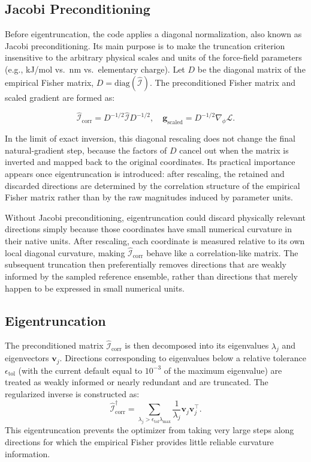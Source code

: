 \subsection{Jacobi Preconditioning}

Before eigentruncation, the code applies a diagonal normalization, also known as Jacobi preconditioning. Its main purpose is to make the truncation criterion insensitive to the arbitrary physical scales and units of the force-field parameters (e.g., kJ/mol vs.\ nm vs.\ elementary charge). Let $D$ be the diagonal matrix of the empirical Fisher matrix, $D = \mathrm{diag}(\widehat{\mathcal{I}})$. The preconditioned Fisher matrix and scaled gradient are formed as:

\begin{equation}
    \widehat{\mathcal{I}}_{\mathrm{corr}} = D^{-1/2} \widehat{\mathcal{I}} D^{-1/2}, \quad \mathbf{g}_{\mathrm{scaled}} = D^{-1/2} \nabla_\phi \mathcal{L}.
\end{equation}

In the limit of exact inversion, this diagonal rescaling does not change the final natural-gradient step, because the factors of $D$ cancel out when the matrix is inverted and mapped back to the original coordinates. Its practical importance appears once eigentruncation is introduced: after rescaling, the retained and discarded directions are determined by the correlation structure of the empirical Fisher matrix rather than by the raw magnitudes induced by parameter units.

Without Jacobi preconditioning, eigentruncation could discard physically relevant directions simply because those coordinates have small numerical curvature in their native units. After rescaling, each coordinate is measured relative to its own local diagonal curvature, making $\widehat{\mathcal{I}}_{\mathrm{corr}}$ behave like a correlation-like matrix. The subsequent truncation then preferentially removes directions that are weakly informed by the sampled reference ensemble, rather than directions that merely happen to be expressed in small numerical units.

\subsection{Eigentruncation}

The preconditioned matrix $\widehat{\mathcal{I}}_{\mathrm{corr}}$ is then decomposed into its eigenvalues $\lambda_j$ and eigenvectors $\mathbf{v}_j$. Directions corresponding to eigenvalues below a relative tolerance $\epsilon_{\mathrm{tol}}$ (with the current default equal to $10^{-3}$ of the maximum eigenvalue) are treated as weakly informed or nearly redundant and are truncated. The regularized inverse is constructed as:
\begin{equation}
    \widehat{\mathcal{I}}_{\mathrm{corr}}^{\dagger} = \sum_{\lambda_j > \epsilon_{\mathrm{tol}} \lambda_{\max}} \frac{1}{\lambda_j} \mathbf{v}_j \mathbf{v}_j^\top.
\end{equation}
This eigentruncation prevents the optimizer from taking very large steps along directions for which the empirical Fisher provides little reliable curvature information.

